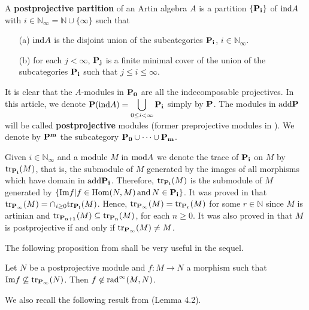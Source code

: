 A {\bf postprojective partition} of an Artin algebra $A$ is a partition $\{ \bf{P_i} \}$ of ${\rm ind}A$ with $i\in
\mathbb{N}_{\infty}=\mathbb{N}\cup{\{ \infty} \}$ such that

\begin{itemize}
\item[(a)] ${\rm ind}A$ is the disjoint union of the subcategories ${\bf
P_i}$, $i \in \mathbb{N}_{\infty}$.
\item[(b)] for each $j<{\infty}$, ${\bf P_j}$ is a finite minimal cover of the union of the subcategories ${\bf
P_i}$ such that $j \leq i \leq {\infty}$. 
\end{itemize}

It is clear that the $A$-modules in ${\bf P_0}$ are all the indecomposable projectives. In this article, we denote ${\bf P}({\rm ind}A)= \displaystyle\bigcup_{0 \leq i <{\infty}}{\bf P_i}$ simply by ${\bf P}$. The modules in ${\rm add}{\bf P}$ will be called {\bf postprojective} modules (former preprojective modules in \cite{auslander}). We denote by ${\bf P^m}$ the subcategory ${\bf P_0} \cup \cdots \cup {\bf P_{m}}$.

Given $i \in \mathbb{N}_{\infty}$ and a module $M$ in ${\rm mod}A$
we denote the trace of ${\bf P_i}$ on $M$ by ${\rm tr}_{\bf P_i}(M)$, that is, the submodule of $M$ generated by the images of all morphisms which have domain in ${\rm add}{\bf P_i}$. Therefore, ${\rm tr}_{\bf P_i}(M)$ is the submodule of  $M$ generated by $\{ {\rm Im}f | f \in {\rm Hom}(N,M) \, {\rm and} \, N \in {\bf P_i} \}$. It was proved in \cite{auslander} that ${\rm tr}_{\bf P_{\infty}}(M)= \displaystyle\cap_{i\geq 0}
{\rm tr}_{\bf P_{i}}(M)$. Hence, $ {\rm tr}_{\bf P_{\infty}}(M)= {\rm tr}_{\bf 
P_{r}}(M)$ for some $r \in \mathbb{N}$ since $M$ is artinian and ${\rm tr}_{\bf P_{n+1}}(M) \subseteq {\rm tr}_{\bf P_{n}}(M)$,  for each $n \geq 0$. It was also proved in \cite{auslander} that $M$ is postprojective if and only if ${\rm tr}_{\bf P_{\infty}}(M) \neq M$.

The following proposition from \cite{coelho1} shall be very useful in the sequel.

\begin{prop}
\label{lema1}
{\rm \cite{coelho1}}
Let $N$ be a postprojective module and $f : M \rightarrow N$ a morphism such that $ {\rm Im}f \not\subseteq {\rm tr}_{\bf{P_{\infty}}}(N)$. Then $f \not\in {\rm rad}^{\infty}(M,N)$.
\end{prop}

We also recall the following result from \cite{coelhosilva1} (Lemma 4.2).

